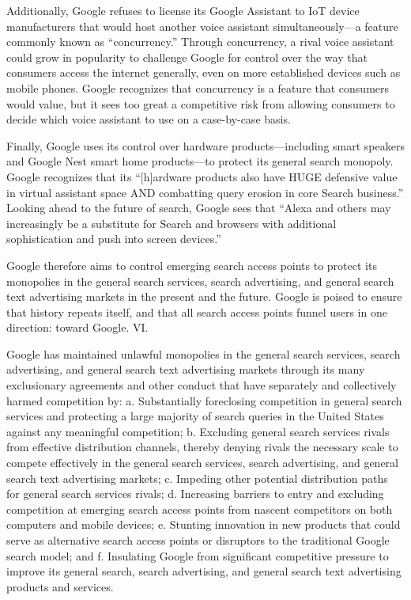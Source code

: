 \documentclass[11pt,b5paper]{scrartcl}
\begin{document}

Additionally, Google refuses to license its Google Assistant to IoT device
manufacturers that would host another voice assistant simultaneously—a feature commonly
known as “concurrency.” Through concurrency, a rival voice assistant could grow in popularity
to challenge Google for control over the way that consumers access the internet generally, even
on more established devices such as mobile phones. Google recognizes that concurrency is a
feature that consumers would value, but it sees too great a competitive risk from allowing
consumers to decide which voice assistant to use on a case-by-case basis.


Finally, Google uses its control over hardware products—including smart
speakers and Google Nest smart home products—to protect its general search monopoly. Google
recognizes that its “[h]ardware products also have HUGE defensive value in virtual assistant
space AND combatting query erosion in core Search business.” Looking ahead to the future of
search, Google sees that “Alexa and others may increasingly be a substitute for Search and
browsers with additional sophistication and push into screen devices.”


Google therefore aims to control emerging search access points to protect its
monopolies in the general search services, search advertising, and general search text advertising
markets in the present and the future. Google is poised to ensure that history repeats itself, and
that all search access points funnel users in one direction: toward Google.
VI.


Google has maintained unlawful monopolies in the general search services, search
advertising, and general search text advertising markets through its many exclusionary
agreements and other conduct that have separately and collectively harmed competition by:
a.
Substantially foreclosing competition in general search services and
protecting a large majority of search queries in the United States against
any meaningful competition;
b.
Excluding general search services rivals from effective distribution
channels, thereby denying rivals the necessary scale to compete effectively
in the general search services, search advertising, and general search text
advertising markets;
c.
Impeding other potential distribution paths for general search services
rivals;
d.
Increasing barriers to entry and excluding competition at emerging search
access points from nascent competitors on both computers and mobile
devices;
e.
Stunting innovation in new products that could serve as alternative search
access points or disruptors to the traditional Google search model; and
f.
Insulating Google from significant competitive pressure to improve its
general search, search advertising, and general search text advertising
products and services.
\end{document}

